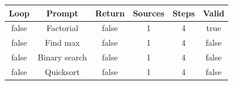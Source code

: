 \begin{table}[h]
\centering
\begin{tabular}{ |c|c|c|c|c|c| }
\hline
Loop & Prompt & Return & Sources & Steps & Valid \\
\hline
false & Factorial & false & 1 & 4 & true \\
\hline
false & Find max & false & 1 & 4 & false \\
\hline
false & Binary search & false & 1 & 4 & false \\
\hline
false & Quicksort & false & 1 & 4 & false \\
\hline
\end{tabular}
\end{table}
